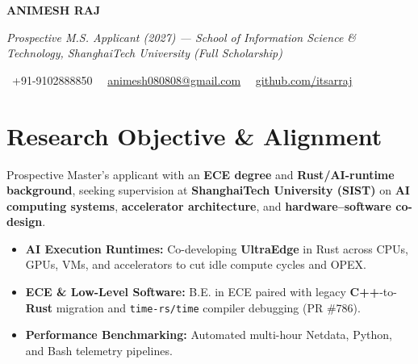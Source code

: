 \documentclass[a4paper,11pt]{article}
\newcommand{\socialicon}[1]{\raisebox{-0.05em}{\resizebox{!}{1em}{#1}}}
\newcommand{\headerfontiii}{\fontfamily{ppl}\selectfont} %
\begin{document}
\headerfontiii

\begin{center}
    {\Huge\textbf{ANIMESH RAJ}}
\end{center}
\vspace{-6mm}

\begin{center}
    {\small\textit{Prospective M.S. Applicant (2027) --- School of Information Science \& Technology, ShanghaiTech University (Full Scholarship)}}
\end{center}
\vspace{-6mm}

\begin{center}
    {\small
    \socialicon{\faPhone}\ +91-9102888850 \textbar\ 
    \socialicon{\faEnvelope}\ \href{mailto:animesh080808@gmail.com}{animesh080808@gmail.com} \textbar\ 
    \socialicon{\faGithub}\ \href{https://github.com/itsarraj}{github.com/itsarraj}
    }
\end{center}
\vspace{-4mm}

\section{\textbf{Research Objective \& Alignment}}
\vspace{1mm}
{\small
Prospective Master's applicant with an \textbf{ECE degree} and \textbf{Rust/AI-runtime background}, seeking supervision at \textbf{ShanghaiTech University (SIST)} on \textbf{AI computing systems}, \textbf{accelerator architecture}, and \textbf{hardware–software co-design}.
\begin{itemize}[leftmargin=3ex, itemsep=0.4mm, topsep=1mm]
    \item \textbf{AI Execution Runtimes:} Co-developing \textbf{UltraEdge} in Rust across CPUs, GPUs, VMs, and accelerators to cut idle compute cycles and OPEX.
    \item \textbf{ECE \& Low-Level Software:} B.E. in ECE paired with legacy \textbf{C++}-to-\textbf{Rust} migration and \texttt{time-rs/time} compiler debugging (PR \#786).
    \item \textbf{Performance Benchmarking:} Automated multi-hour Netdata, Python, and Bash telemetry pipelines.
\end{itemize}
}
\vspace{-3mm}
\end{document}
